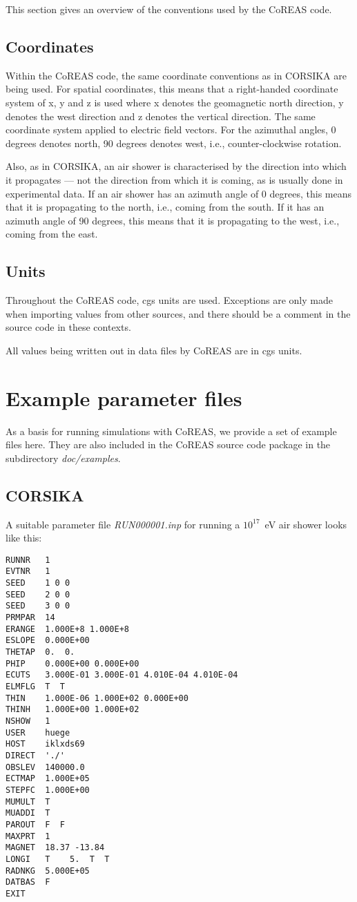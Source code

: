\documentclass[a4paper,10pt]{article}
\begin{document}
This section gives an overview of the conventions used by the CoREAS code.

\subsection{Coordinates}

Within the CoREAS code, the same coordinate conventions as in CORSIKA are being used. For spatial coordinates, this means that a right-handed coordinate system of x, y and z is used where x denotes the geomagnetic north direction, y denotes the west direction and z denotes the vertical direction. The same coordinate system applied to electric field vectors. For the azimuthal angles, 0 degrees denotes north, 90 degrees denotes west, i.e., counter-clockwise rotation.

Also, as in CORSIKA, an air shower is characterised by the direction into which it propagates --- not the direction from which it is coming, as is usually done in experimental data. If an air shower has an azimuth angle of 0 degrees, this means that it is propagating to the north, i.e., coming from the south. If it has an azimuth angle of 90 degrees, this means that it is propagating to the west, i.e., coming from the east.

\subsection{Units}

Throughout the CoREAS code, cgs units are used. Exceptions are only made when importing values from other sources, and there should be a comment in the source code in these contexts.

All values being written out in data files by CoREAS are in cgs units.

\section{Example parameter files} \label{sec:examplefiles}

As a basis for running simulations with CoREAS, we provide a set of example files here. They are also included in the CoREAS source code package in the subdirectory {\it doc/examples}.

\subsection{CORSIKA}

A suitable parameter file {\it RUN000001.inp} for running a $10^{17}$~eV air shower looks like this:
%
\begin{verbatim}
RUNNR   1
EVTNR   1
SEED    1 0 0
SEED    2 0 0
SEED    3 0 0
PRMPAR  14
ERANGE  1.000E+8 1.000E+8
ESLOPE  0.000E+00
THETAP  0.  0.
PHIP    0.000E+00 0.000E+00
ECUTS   3.000E-01 3.000E-01 4.010E-04 4.010E-04
ELMFLG  T  T
THIN    1.000E-06 1.000E+02 0.000E+00
THINH   1.000E+00 1.000E+02
NSHOW   1
USER    huege
HOST    iklxds69
DIRECT  './'
OBSLEV  140000.0
ECTMAP  1.000E+05
STEPFC  1.000E+00
MUMULT  T
MUADDI  T
PAROUT  F  F
MAXPRT  1
MAGNET  18.37 -13.84
LONGI   T    5.  T  T
RADNKG  5.000E+05
DATBAS  F
EXIT
\end{verbatim}
\end{document}
